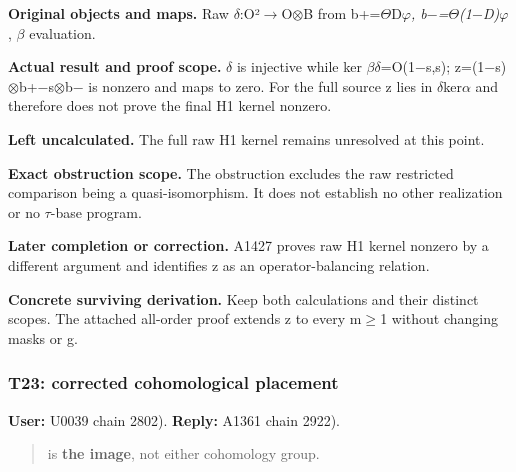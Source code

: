 \textbf{Original objects and maps.} Raw
\allowbreak{}\ensuremath{δ}\allowbreak{}:O²\allowbreak{}\ensuremath{→}\allowbreak{}O\allowbreak{}\ensuremath{⊗}\allowbreak{}B
from
b+=\allowbreak{}\ensuremath{Θ}\allowbreak{}D\allowbreak{}\ensuremath{φ}\allowbreak{}\emph{,
b\allowbreak{}\ensuremath{−}\allowbreak{}=\allowbreak{}\ensuremath{Θ}\allowbreak{}(1\allowbreak{}\ensuremath{−}\allowbreak{}D)\allowbreak{}\ensuremath{φ}\allowbreak{}},
\allowbreak{}\ensuremath{β}\allowbreak{} evaluation.

\textbf{Actual result and proof scope.}
\allowbreak{}\ensuremath{δ}\allowbreak{} is injective while ker
\allowbreak{}\ensuremath{β}\allowbreak{}\allowbreak{}\ensuremath{δ}\allowbreak{}=O(1\allowbreak{}\ensuremath{−}\allowbreak{}s,s);
z=(1\allowbreak{}\ensuremath{−}\allowbreak{}s)\allowbreak{}\ensuremath{⊗}\allowbreak{}b+\allowbreak{}\ensuremath{−}\allowbreak{}s\allowbreak{}\ensuremath{⊗}\allowbreak{}b\allowbreak{}\ensuremath{−}\allowbreak{}
is nonzero and maps to zero. For the full source z lies in
\allowbreak{}\ensuremath{δ}\allowbreak{}ker\allowbreak{}\ensuremath{α}\allowbreak{}
and therefore does not prove the final H1 kernel nonzero.

\textbf{Left uncalculated.} The full raw H1 kernel remains unresolved at
this point.

\textbf{Exact obstruction scope.} The obstruction excludes the raw
restricted comparison being a quasi-isomorphism. It does not establish
no other realization or no \allowbreak{}\ensuremath{τ}\allowbreak{}-base
program.

\textbf{Later completion or correction.} A1427 proves raw H1 kernel
nonzero by a different argument and identifies z as an
operator-balancing relation.

\textbf{Concrete surviving derivation.} Keep both calculations and their
distinct scopes. The attached all-order proof extends z to every
m\allowbreak{}\ensuremath{≥}\allowbreak{}1 without changing masks or g.

\subsubsection{T23: corrected cohomological
placement}\label{TranscriptLedgerStage:t23-corrected-cohomological-placement}

\textbf{User:} U0039
\protect{} chain 2802).
\textbf{Reply:} A1361
\protect{} chain 2922).

\begin{quote}
is \textbf{the image}, not either cohomology group.
\end{quote}

